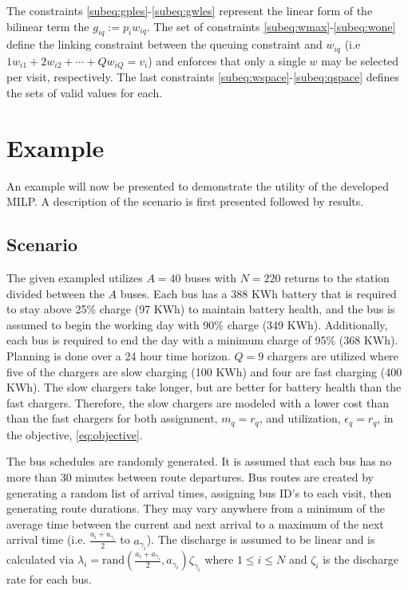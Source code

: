 \documentclass[letterpaper, 10pt, conference]{IEEEtran}
\begin{document}
The constraints \eqref{subeq:gples}-\eqref{subeq:gwles} represent the linear form of the bilinear term the $g_{iq} := p_i w_{iq}$. The set of constraints \eqref{subeq:wmax}-\eqref{subeq:wone} define the linking constraint between the queuing constraint and $w_{iq}$ (i.e $1w_{i1} + 2w_{i2} + \cdots + Qw_{iQ} = v_i$) and enforces that only a single $w$ may be selected per visit, respectively. The last constraints \eqref{subeq:wspace}-\eqref{subeq:qspace} defines the sets of valid values for each.

\section{Example}
\label{sec:example}

An example will now be presented to demonstrate the utility of the developed MILP. A description of the scenario is first presented followed by results.

\subsection{Scenario}
The given exampled utilizes $A = 40$ buses with $N = 220$ returns to the station divided between the $A$ buses. Each bus has a 388 KWh battery that is required to stay above 25\% charge (97 KWh) to maintain battery health, and the bus is assumed to begin the working day with 90\% charge (349 KWh). Additionally, each bus is required to end the day with a minimum charge of 95\% (368 KWh). Planning is done over a 24 hour time horizon. $Q = 9$ chargers are utilized where five of the chargers are slow charging (100 KWh) and four are fast charging (400 KWh). The slow chargers take longer, but are better for battery health than the fast chargers. Therefore, the slow chargers are modeled with a lower cost than than the fast chargers for both assignment, $m_q = r_q$, and utilization, $\epsilon_q = r_q$, in the objective, \eqref{eq:objective}.

The bus schedules are randomly generated. It is assumed that each bus has no more than 30 minutes between route departures. Bus routes are created by generating a random list of arrival times, assigning bus ID's to each visit, then generating route durations. They may vary anywhere from a minimum of the average time between the current and next arrival to a maximum of the next arrival time (i.e. $\frac{a_i + a_{\gamma_i}}{2}$ to $a_{\gamma_i}$). The discharge is assumed to be linear and is calculated via $\lambda_i = \text{rand}(\frac{a_i + a_{\gamma_i}}{2},a_{\gamma_i})\zeta_{\gamma_i}$ where $1 \leq i \leq N$ and $\zeta_i$ is the discharge rate for each bus.
\end{document}
